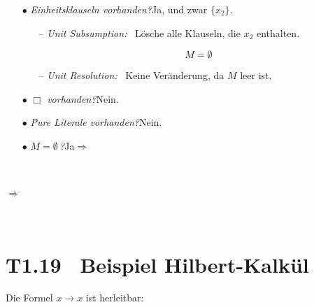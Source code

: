 \documentclass[fontsize=11pt, twoside=false, numbers=autoenddot]{scrbook}
\begin{document}
{{\begin{itemize}
{{\begin{itemize}
\begin{itemize}
\[                  M = \big\{\{x_2\}\big\}
                \]
                \par\vspace*{-.1\baselineskip}
            \end{itemize}
          \item[$\bullet$]
            \emph{Einheitsklauseln vorhanden?}\quad Ja, und zwar $\{x_2\}$.
            \begin{itemize}
              \item[--]
                \emph{Unit Subsumption:}~ Lösche alle Klauseln, die $x_2$ enthalten.
                \par\vspace*{-.5\baselineskip}
                \[
                  M = \emptyset
                \]
                \par\vspace*{-.1\baselineskip}
              \item[--]
                \emph{Unit Resolution:}~ Keine Veränderung, da $M$ leer ist.
            \end{itemize}
          \item[$\bullet$]
            \emph{$\Box$ vorhanden?}\quad Nein.
          \item[$\bullet$]
            \emph{Pure Literale vorhanden?}\quad Nein.
          \item[$\bullet$]
            \emph{$M = \emptyset$\,?}\quad Ja\quad $\Rightarrow$ 
        \end{itemize}
        ~\par\vspace*{-1\baselineskip}
      }}

      \par\smallskip
      $\Rightarrow$ 
  \end{itemize}
  ~\par\vspace*{-1.4\baselineskip}
}}

\section*{T1.19~ Beispiel Hilbert-Kalkül}

Die Formel $x \to x$ ist herleitbar:
\end{document}

